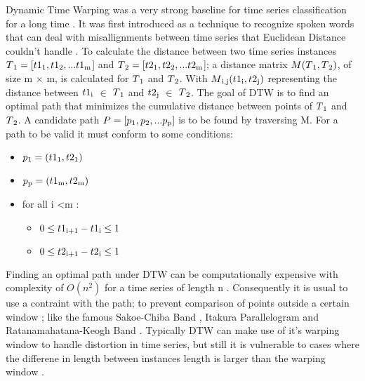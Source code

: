 Dynamic Time Warping was a very strong baseline for time series classification for a long time \cite{abanda2019review,bagnall2017great}.
It was first introduced as a technique to recognize spoken words that can deal with misallignments between time series
that Euclidean Distance couldn't handle \cite{tan2020fastee}.\newline
To calculate the distance between two time series instances  $T\textsubscript{1} = [t1\textsubscript{1},t1\textsubscript{2},...t1\textsubscript{m}$]
and $T\textsubscript{2} = [t2\textsubscript{1},t2\textsubscript{2},...t2\textsubscript{m}$];
a distance matrix $M(T\textsubscript{1},T\textsubscript{2})$, of size m $\times$ m, is calculated for $T\textsubscript{1}$ and $T\textsubscript{2}$.
With $M\textsubscript{i,j}(t1\textsubscript{i},t2\textsubscript{j})$ representing the distance between $t1\textsubscript{i}$ $\in$ $T\textsubscript{1}$
and $t2\textsubscript{j}$ $\in$ $T\textsubscript{2}$.
The goal of DTW is to find an optimal path that minimizes the cumulative distance between points of $T\textsubscript{1}$ and $T\textsubscript{2}$.\newline
A candidate path $P = [p\textsubscript{1},p\textsubscript{2},...p\textsubscript{p}]$ is to be found by traversing M.
For a path to be valid it must conform to some conditions:
\begin{itemize}
    \item $p\textsubscript{1} = (t1\textsubscript{1},t2\textsubscript{1})$
    \item $p\textsubscript{p} = (t1\textsubscript{m},t2\textsubscript{m})$
    \item for all i \textless m :
        \begin{itemize}
            \item $0 \leq t1\textsubscript{i+1} - t1\textsubscript{i} \leq 1$
            \item $0 \leq t2\textsubscript{i+1} - t2\textsubscript{i} \leq 1$
        \end{itemize}
\end{itemize}

Finding an optimal path under DTW can be computationally expensive with complexity of $O(n^2)$ for a time series of length n \cite{schafer2017fast,petitjean2016faster}.
Consequently it is usual to use a contraint with the path; to prevent comparison of points outside a certain window \cite{tan2020fastee}; like the famous Sakoe-Chiba Band \cite{sakoe1978dynamic}, Itakura Parallelogram \cite{itakura1975minimum} and Ratanamahatana-Keogh Band \cite{ratanamahatana2004making}.
Typically DTW can make use of it's warping window to handle distortion in time series,
but still it is vulnerable to cases where the differene in length between instances length is larger than the warping window \cite{tan2019time}.
